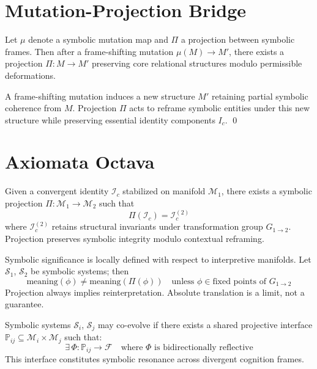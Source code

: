 \section*{Mutation-Projection Bridge}
\label{sec:bk8_mutuation_projection_bridge}
\begin{lemma}
\label{lemma:bk8_mutation_projection}
Let $\mu$ denote a symbolic mutation map and $\Pi$ a projection between symbolic frames. Then after a frame-shifting mutation $\mu(M) \to M'$, there exists a projection $\Pi : M \to M'$ preserving core relational structures modulo permissible deformations.
\end{lemma}
\begin{demonstratio}[Projection]
\label{demonstratio:bk8_projection}
A frame-shifting mutation induces a new structure $M'$ retaining partial symbolic coherence from $M$. Projection $\Pi$ acts to reframe symbolic entities under this new structure while preserving essential identity components $I_c$. \qed
\end{demonstratio}
\section*{Axiomata Octava}
\label{sec:bk8_axiomata_octava}
\begin{axiom}
\label{axiom:bk8_observer_bounded_emergence}
Given a convergent identity $\mathscr{I}_c$ stabilized on manifold $\mathcal{M}_1$, there exists a symbolic projection $\Pi : \mathcal{M}_1 \to \mathcal{M}_2$ such that
\[
\Pi(\mathscr{I}_c) = \mathscr{I}_c^{(2)}
\]
where $\mathscr{I}_c^{(2)}$ retains structural invariants under transformation group $G_{1\to2}$. Projection preserves symbolic integrity modulo contextual reframing.
\end{axiom}
\begin{axiom}
\label{axiom:bk8_binding_curvature_limit}
Symbolic significance is locally defined with respect to interpretive manifolds. Let $\mathscr{S}_1$, $\mathscr{S}_2$ be symbolic systems; then
\[
 \text{meaning}(\phi) \neq \text{meaning}(\Pi(\phi)) \quad \text{unless } \phi \in \text{fixed points of } G_{1\to2}
\]
Projection always implies reinterpretation. Absolute translation is a limit, not a guarantee.
\end{axiom}
\begin{axiom}
\label{axiom:bk8_coherence_horizon}
Symbolic systems $\mathscr{S}_i$, $\mathscr{S}_j$ may co-evolve if there exists a shared projective interface $\mathbb{P}_{ij} \subseteq \mathcal{M}_i \times \mathcal{M}_j$ such that:
\[
\exists \, \Phi : \mathbb{P}_{ij} \to \mathcal{F} \quad \text{where } \Phi \text{ is bidirectionally reflective}
\]
This interface constitutes symbolic resonance across divergent cognition frames.
\end{axiom}
